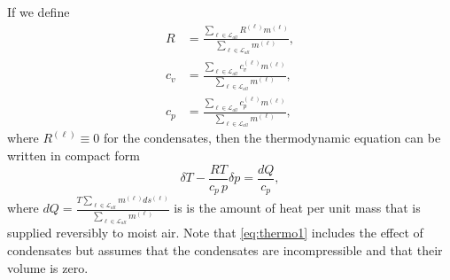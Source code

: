 \documentclass{agujournal}
\begin{document}
{If we define 
\begin{align}
R  &=\frac{\sum_{\ell \in \mathcal{L}_{all}} R^{(\ell)} m^{(\ell)}}{\sum_{\ell \in \mathcal{L}_{all}} m^{(\ell)}},\\
c_v&=\frac{\sum_{\ell \in \mathcal{L}_{all}} c_v^{(\ell)}m^{(\ell)}}{\sum_{\ell \in \mathcal{L}_{all}} m^{(\ell)}},\\
c_p&=\frac{\sum_{\ell \in \mathcal{L}_{all}} c_p^{(\ell)}m^{(\ell)}}{\sum_{\ell \in \mathcal{L}_{all}} m^{(\ell)}},\label{eq:cp}
\end{align}
where $R^{(\ell)}\equiv 0$ for the condensates, then {} the thermodynamic equation can be written in compact form
\begin{equation}
\delta T-\frac{RT}{c_p\, p}\delta p=\frac{d Q}{c_p},\label{eq:thermo1}
\end{equation}
where $dQ=\frac{T \sum_{\ell \in \mathcal{L}_{all}}m^{(\ell)} ds^{(\ell)}}{\sum_{\ell \in \mathcal{L}_{all}}m^{(\ell)}}$ is is the amount of heat per unit mass that is supplied reversibly to moist air. Note that \eqref{eq:thermo1} includes the effect of condensates but assumes that the condensates are incompressible and that their volume is zero.
}
\end{document}
